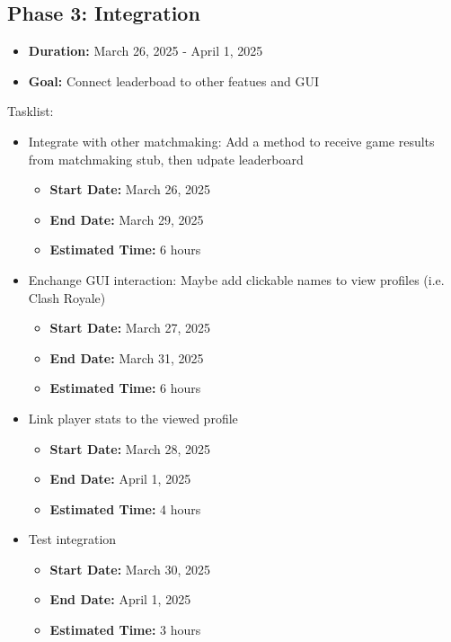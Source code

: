 \documentclass{report}
\begin{document}
\subsection*{Phase 3: Integration}
\begin{itemize}
    \item \textbf{Duration:} March 26, 2025 - April 1, 2025
    \item \textbf{Goal:} Connect leaderboad to other featues and GUI
\end{itemize}
Tasklist:
\begin{itemize}
    \item Integrate with other matchmaking: Add a method to receive game results from matchmaking stub, then udpate leaderboard
    \begin{itemize}
        \item \textbf{Start Date:} March 26, 2025
        \item \textbf{End Date:} March 29, 2025
        \item \textbf{Estimated Time:} 6 hours
    \end{itemize}
    \item Enchange GUI interaction: Maybe add clickable names to view profiles (i.e. Clash Royale)
    \begin{itemize}
        \item \textbf{Start Date:} March 27, 2025
        \item \textbf{End Date:} March 31, 2025
        \item \textbf{Estimated Time:} 6 hours
    \end{itemize}
    \item Link player stats to the viewed profile
    \begin{itemize}
        \item \textbf{Start Date:} March 28, 2025
        \item \textbf{End Date:} April 1, 2025
        \item \textbf{Estimated Time:} 4 hours
    \end{itemize}
    \item Test integration
    \begin{itemize}
        \item \textbf{Start Date:} March 30, 2025
        \item \textbf{End Date:} April 1, 2025
        \item \textbf{Estimated Time:} 3 hours
    \end{itemize}


\end{itemize}
\end{document}
